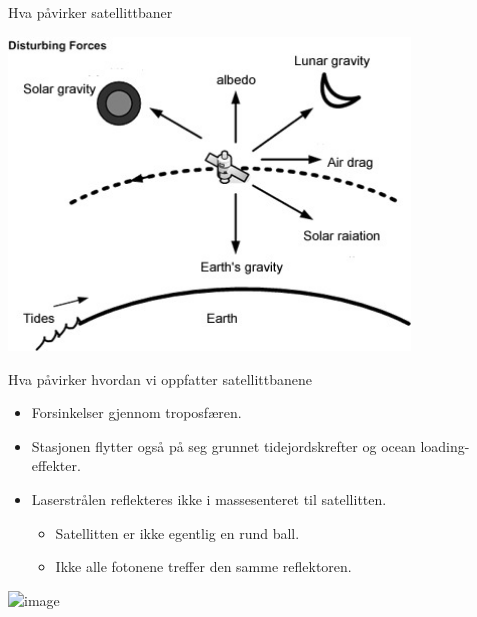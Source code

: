 \documentclass[12pt,table,t]{beamer}
\begin{document}
\begin{frame}{Hva påvirker satellittbaner}

  \begin{center}
    \includegraphics[width=0.8\textwidth]{figure/sat.jpg}
  \end{center}
\end{frame}


\begin{frame}{Hva påvirker hvordan vi oppfatter satellittbanene}
  \begin{itemize}
  \item Forsinkelser gjennom troposfæren.
  \item Stasjonen flytter også på seg grunnet tidejordskrefter og ocean loading-effekter.
  \item Laserstrålen reflekteres ikke i massesenteret til satellitten.
    \begin{itemize}
    \item<2-> Satellitten er ikke egentlig en rund ball.
    \item<2-> Ikke alle fotonene treffer den samme reflektoren.
    \end{itemize}
  \end{itemize}

  \begin{center}
    \includegraphics<2->[width=0.3\textwidth]{figure/corners}
  \end{center}
\end{frame}
\end{document}
